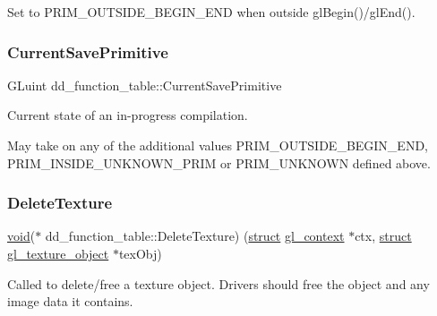 Set to P\+R\+I\+M\+\_\+\+O\+U\+T\+S\+I\+D\+E\+\_\+\+B\+E\+G\+I\+N\+\_\+\+E\+ND when outside gl\+Begin()/gl\+End(). \mbox{\label{structdd__function__table_a80c1223fd161cbdbe0986f94eb6abe90}} 
\subsubsection{\texorpdfstring{Current\+Save\+Primitive}{CurrentSavePrimitive}}
{\footnotesize\ttfamily G\+Luint dd\+\_\+function\+\_\+table\+::\+Current\+Save\+Primitive}

Current state of an in-\/progress compilation.

May take on any of the additional values P\+R\+I\+M\+\_\+\+O\+U\+T\+S\+I\+D\+E\+\_\+\+B\+E\+G\+I\+N\+\_\+\+E\+ND, P\+R\+I\+M\+\_\+\+I\+N\+S\+I\+D\+E\+\_\+\+U\+N\+K\+N\+O\+W\+N\+\_\+\+P\+R\+IM or P\+R\+I\+M\+\_\+\+U\+N\+K\+N\+O\+WN defined above. \mbox{\label{structdd__function__table_abdddd372703dc0ab4786e62e73c879a9}} 
\subsubsection{\texorpdfstring{Delete\+Texture}{DeleteTexture}}
{\footnotesize\ttfamily \hyperlink{interfacevoid}{void}($\ast$ dd\+\_\+function\+\_\+table\+::\+Delete\+Texture) (\hyperlink{interfacestruct}{struct} \hyperlink{structgl__context}{gl\+\_\+context} $\ast$ctx, \hyperlink{interfacestruct}{struct} \hyperlink{structgl__texture__object}{gl\+\_\+texture\+\_\+object} $\ast$tex\+Obj)}

Called to delete/free a texture object. Drivers should free the object and any image data it contains. \mbox{\label{structdd__function__table_a7b924d27d8e7c19e5aa91c466705a569}} 
